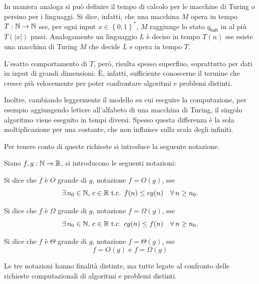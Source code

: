 In maniera analoga si può definire il tempo di calcolo per le macchine di Turing o persino per i linguaggi.
Si dice, infatti, che una macchina $M$ opera in tempo $T: \mathbb{N} \to \mathbb{N}$ sse, per ogni input $x \in \left\{0,1\right\}^*$, $M$ raggiunge lo stato $q_{\mathsf{halt}}$ in al più $T(|x|)$ passi.
Analogamente un linguaggio $L$ è deciso in tempo $T(n)$ sse esiste una macchina di Turing $M$ che decide $L$ e opera in tempo $T$.

L'esatto comportamento di $T$, però, risulta spesso superfluo, soprattutto per dati in input di grandi dimensioni.
È, infatti, sufficiente conoscerne il termine che cresce più velocemente per poter confrontare algoritmi e problemi distinti.

Inoltre, cambiando leggermente il modello su cui eseguire la computazione, per esempio aggiungendo lettere all'alfabeto di una macchina di Turing, il singolo algoritmo viene eseguito in tempi diversi. Spesso questa differenza è la sola moltiplicazione per una costante, che non influisce sulla scala degli infiniti.

Per tenere conto di queste richieste si introduce la seguente notazione.

\begin{defn}\label{defn:Oh_notation}
 Siano $f,g : \mathbb{N} \to \mathbb{R}$, si introducono le seguenti notazioni:
 \begin{description}[align=left]
  \item [$O$ grande:] Si dice che $f$ è $O$ grande di $g$, notazione $f = O(g)$, sse 
  \begin{equation}
   \exists\, n_0 \in \mathbb{N} \text{, } c \in \mathbb{R} \text{ t.c. } f(n) \leq cg(n)\quad \forall \, n \geq n_0.
  \end{equation}
  \item [$\mathbf{\Omega}$ grande:] Si dice che $f$ è $\Omega$ grande di $g$, notazione $f = \Omega(g)$, sse 
  \begin{equation}
   \exists\, n_0 \in \mathbb{N} \text{, } c \in \mathbb{R} \text{ t.c. }  cg(n) \leq f(n) \quad \forall \, n \geq n_0.
  \end{equation}
  \item [$\mathbf{\Theta}$ grande:] Si dice che $f$ è $\Theta$ grande di $g$, notazione $f = \Theta(g)$, sse
  \begin{equation}
   f = O(g) \text{ e } f = \Omega(g)
  \end{equation}
 \end{description}
\end{defn}
Le tre notazioni hanno finalità distinte, ma tutte legate al confronto delle richieste computazionali di algoritmi e problemi distinti.

